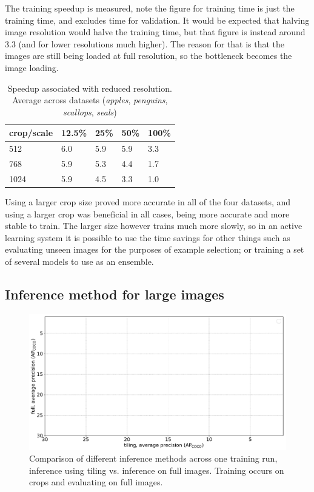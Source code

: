The training speedup is measured, note the figure for training time is just the training time, and excludes time for validation. It would be expected that halving image resolution would halve the training time, but that figure is instead around $3.3$ (and for lower resolutions much higher). The reason for that is that the images are still being loaded at full resolution, so the bottleneck becomes the image loading.

\begin{table}[ht]
  \centering
    \caption{Speedup associated with reduced resolution. Average across datasets (\emph{apples}, \emph{penguins}, \emph{scallops}, \emph{seals})  }
  \begin{tabular}{ l | l l l l}
    crop/scale & 12.5\% & 25\% & 50\% & 100\% \\
    \toprule
        512   & 6.0  & 5.9  &  5.9  & 3.3 \\
        768   & 5.9 & 5.3  &  4.4 &  1.7 \\
        1024  & 5.9 & 4.5  &  3.3  & 1.0 \\
    \bottomrule
  \end{tabular}
\label{fig:speed_scale_crop}
\end{table}


Using a larger crop size proved more accurate in all of the four datasets, and using a larger crop was beneficial in all cases, being more accurate and more stable to train. The larger size however trains much more slowly, so in an active learning system it is possible to use the time savings for other things such as evaluating unseen images for the purposes of example selection; or training a set of several models to use as an ensemble.


\subsection {Inference method for large images}

\begin{figure}[h]
  \centering
  \includegraphics[width=1.0\linewidth]{charts/training/splits_scatters.pdf}
  \caption{Comparison of different inference methods across one training run, inference using tiling vs. inference on full images. Training occurs on crops and evaluating on full images. }  
  \label{fig:inference_method}
\end{figure}


